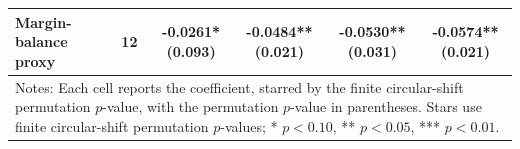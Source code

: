 \begin{tabular}{llcccc}
Margin-balance proxy & 12 & \shortstack{-0.0261*\\(0.093)} & \shortstack{-0.0484**\\(0.021)} & \shortstack{-0.0530**\\(0.031)} & \shortstack{-0.0574**\\(0.021)} \\
\midrule
\multicolumn{6}{l}{\parbox{\dimexpr\textwidth-10pt\relax}{\footnotesize Notes: Each cell reports the coefficient, starred by the finite circular-shift permutation $p$-value, with the permutation $p$-value in parentheses. Stars use finite circular-shift permutation $p$-values; * $p<0.10$, ** $p<0.05$, *** $p<0.01$.}} \\
\bottomrule
\end{tabular}

\endgroup